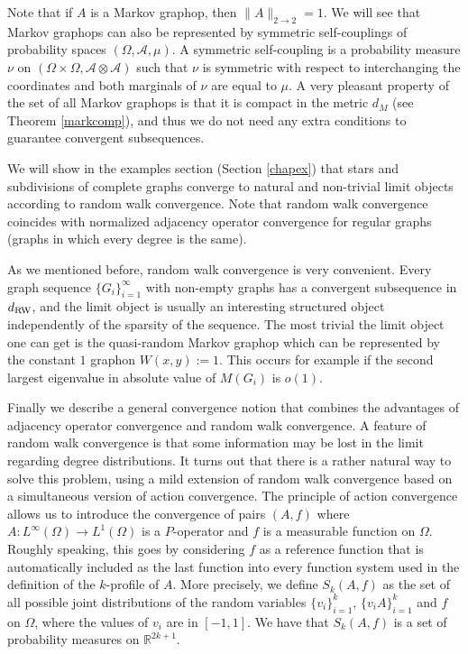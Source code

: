 \documentclass[a4wider]{amsart}
\theoremstyle{definitionbreak}\newtheorem{D}[theorem]{Definition}
\theoremstyle{definitionbreak}\newtheorem*{D*}{Definition}
\begin{document}
\smallskip

Note that if $A$ is a Markov graphop, then $\|A\|_{2\to 2}=1$. We will see that Markov graphops can also be represented by symmetric self-couplings of probability spaces $(\Omega,\mathcal{A},\mu)$. A symmetric self-coupling is a probability measure $\nu$ on $(\Omega\times\Omega,\mathcal{A}\otimes\mathcal{A})$ such that $\nu$ is symmetric with respect to interchanging the coordinates and both marginals of $\nu$ are equal to $\mu$.
A very pleasant property of the set of all Markov graphops is that it is compact in the metric $d_M$ (see Theorem \ref{markcomp}), and thus we do not need any extra conditions to guarantee convergent subsequences. 


We will show in the examples section (Section \ref{chapex}) that stars and subdivisions of complete graphs converge to natural and non-trivial limit objects according to random walk convergence. Note that random walk convergence coincides with normalized adjacency operator convergence for regular graphs (graphs in which every degree is the same).

As we mentioned before, random walk convergence is very convenient. Every graph sequence $\{G_i\}_{i=1}^\infty$ with non-empty graphs has a convergent subsequence in $d_{\rm RW}$, and  the limit object is usually an interesting structured object independently of the sparsity of the sequence. The most trivial the limit object one can get is the quasi-random Markov graphop which can be represented by the constant $1$ graphon $W(x,y):=1$. This occurs for example if the second largest eigenvalue in absolute value of $M(G_i)$ is $o(1)$. 



 Finally we describe a general convergence notion that combines the advantages of adjacency operator convergence and random walk convergence. A feature of random walk convergence is that some information may be lost in the limit regarding degree distributions. It turns out that there is a rather natural way to solve this problem, using a mild extension of random walk convergence based on a simultaneous version of action convergence. The principle of action convergence allows us to introduce the convergence of pairs $(A,f)$ where  $A:L^\infty(\Omega)\to L^1(\Omega)$ is a $P$-operator and $f$ is a measurable function on $\Omega$. Roughly speaking, this goes by considering $f$ as a reference function that is automatically included as the last function into every function system used in the definition of the $k$-profile of $A$. More precisely, we define $S_k(A,f)$ as the set of all possible joint distributions of the random variables $\{v_i\}_{i=1}^k$, $\{v_iA\}_{i=1}^k$  and $f$ on $\Omega$, where the values of $v_i$ are in $[-1,1]$. We have that $S_k(A,f)$ is a set of probability measures on $\mathbb{R}^{2k+1}$. 
\end{document}
